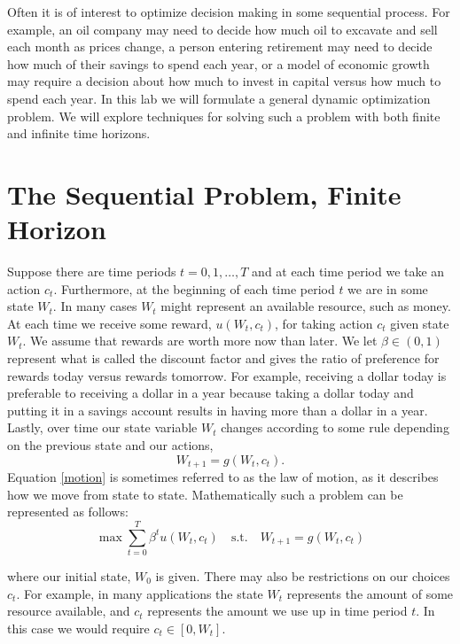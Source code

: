 

Often it is of interest to optimize decision making in some sequential process.  For example, an oil company may need to decide how much oil to excavate and sell each month as prices change, a person entering retirement may need to decide how much of their savings to spend each year, or a model of economic growth may require a decision about how much to invest in capital versus how much to spend each year.  In this lab we will formulate a general dynamic optimization problem.  We will explore techniques for solving such a problem with both finite and infinite time horizons.

\section*{The Sequential Problem, Finite Horizon}\label{SecRecProbFinHor}
Suppose there are time periods $t=0,1,\ldots, T$ and at each time period we take an action $c_t$. Furthermore, at the beginning of each time period $t$ we are in some state $W_t$.  In many cases $W_t$ might represent an available resource, such as money.  At each time we receive some reward, $u(W_t,c_t)$, for taking action $c_t$ given state $W_t$.  We assume that rewards are worth more now than later. We let $\beta\in (0,1)$ represent what is called the discount factor and gives the ratio of preference for rewards today versus rewards tomorrow.  For example, receiving a dollar today is preferable to receiving a dollar in a year because taking a dollar today and putting it in a  savings account results in having more than a dollar in a year.  Lastly, over time our state variable $W_t$ changes according to some rule depending on the previous state and our actions,
\begin{equation}\label{motion}
W_{t+1} = g(W_t,c_t).
\end{equation}
Equation \eqref{motion} is sometimes referred to as the law of motion, as it describes how we move from state to state.
Mathematically such a problem can be represented as follows:
\begin{equation}\label{basic_prob}
\max \sum_{t=0}^T \beta^t u(W_t,c_t) \quad \text{s.t.} \quad W_{t+1} = g(W_t,c_t)
\end{equation}

where our initial state, $W_0$ is given.  There may also be restrictions on our choices $c_t$.  For example, in many applications the state $W_t$ represents the amount of some resource available, and $c_t$ represents the amount we use up in time period $t$.  In this case we would require $c_t \in [0,W_t]$.


